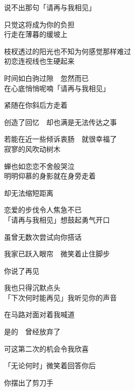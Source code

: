 说不出那句「请再与我相见」

只觉这将成为你的负担
\\

行走在薄暮的缓坡上

枝杈透过的阳光也不知为何感觉那样难过
\\

初恋连视线也生硬起来

时间如白驹过隙　忽然而已
\\

在心底悄悄呢喃「请再与我相见」

紧随在你斜后方走着

创造了回忆　却也满是无法传达之事

若能在近一些倾诉衷肠　就很幸福了
\\

寂寥的风吹动树木

蝉也如恋恋不舍般哭泣
\\

明明仰慕的身影就在身旁走着

却无法缩短距离

恋爱的步伐令人焦急不已
\\

「请再与我相见」想鼓起勇气开口

虽曾无数次尝试向你搭话

我家已跃入眼帘　微笑着止住脚步

你说了再见

我也只得沉默点头
\\

「下次何时能再见」我听见你的声音

在马路对面对着我喊道

是的　曾经放弃了

可这第二次的机会令我欣喜

「无论何时」微笑着回答你后

你摆出了剪刀手
\\
